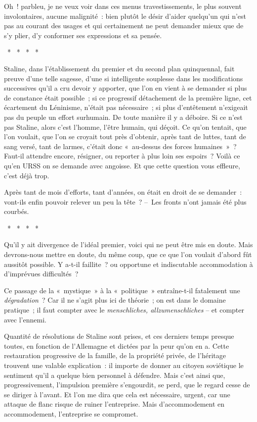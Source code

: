 \documentclass[french,twoside]{book} %
\begin{document}
Oh ! parbleu, je ne veux voir dans ces menus travestissements, le plus souvent involontaires, aucune malignité : bien plutôt le désir d’aider quelqu’un qui n’est pas au courant des usages et qui certainement ne peut demander mieux que de s’y plier, d’y conformer ses expressions et sa pensée.\par
{\centering \noindent *  *  *  *  *\par}
\noindent Staline, dans l’établissement du premier et du second plan quinquennal, fait preuve d’une telle sagesse, d’une si intelligente souplesse dans les modifications successives qu’il a cru devoir y apporter, que l’on en vient à se demander si plus de constance était possible ; si ce progressif détachement de la première ligne, cet écartement du Léninisme, n’était pas nécessaire ; si plus d’entêtement n’exigeait pas du peuple un effort surhumain. De toute manière il y a déboire. Si ce n’est pas Staline, alors c’est l’homme, l’être humain, qui déçoit. Ce qu’on tentait, que l’on voulait, que l’on se croyait tout près d’obtenir, après tant de luttes, tant de sang versé, tant de larmes, c’était donc « au-dessus des forces humaines » ? Faut-il attendre encore, résigner, ou reporter à plus loin ses espoirs ? Voilà ce qu’en URSS on se demande avec angoisse. Et que cette question vous effleure, c’est déjà trop.\par
Après tant de mois d’efforts, tant d’années, on était en droit de se demander : vont-ils enfin pouvoir relever un peu la tête ? – Les fronts n’ont jamais été plus courbés.\par
{\centering \noindent *  *  *  *  *\par}
\noindent Qu’il y ait divergence de l’idéal premier, voici qui ne peut être mis en doute. Mais devrons-nous mettre en doute, du même coup, que ce que l’on voulait d’abord fût aussitôt possible. Y a-t-il faillite ? ou opportune et indiscutable accommodation à d’imprévues difficultés ?\par
Ce passage de la « mystique » à la « politique » entraîne-t-il fatalement une \emph{dégradation} ? Car il ne s’agit plus ici de théorie ; on est dans le domaine pratique ; il faut compter avec le \emph{menschliches, allzumenschliches} – et compter avec l’ennemi.\par
Quantité de résolutions de Staline sont prises, et ces derniers temps presque toutes, en fonction de l’Allemagne et dictées par la peur qu’on en a. Cette restauration progressive de la famille, de la propriété privée, de l’héritage trouvent une valable explication : il importe de donner au citoyen soviétique le sentiment qu’il a quelque bien personnel à défendre. Mais c’est ainsi que, progressivement, l’impulsion première s’engourdit, se perd, que le regard cesse de se diriger à l’avant. Et l’on me dira que cela est nécessaire, urgent, car une attaque de flanc risque de ruiner l’entreprise. Mais d’accommodement en accommodement, l’entreprise se compromet.\par
\end{document}
